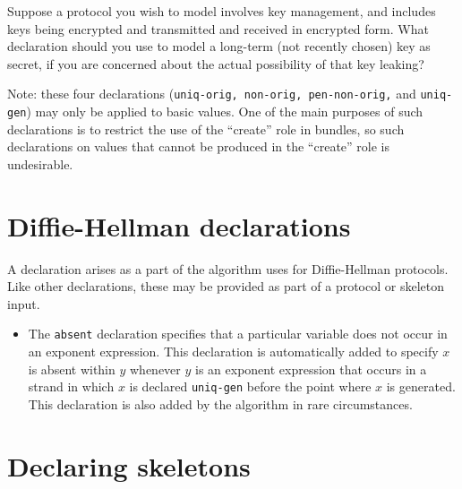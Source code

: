 \begin{exercise}
Suppose a protocol you wish to model involves key management, and
includes keys being encrypted and transmitted and received in
encrypted form.  What declaration should you use to model a long-term
(not recently chosen) key as secret, if you are concerned about the
actual possibility of that key leaking?
\end{exercise}

Note: these four declarations (\texttt{uniq-orig, non-orig,
  pen-non-orig,} and \texttt{uniq-gen}) may only be applied to basic
values.  One of the main purposes of such declarations is to restrict
the use of the ``create'' role in bundles, so such declarations on
values that cannot be produced in the ``create'' role is undesirable.

\section{Diffie-Hellman declarations}
A declaration arises as a part of the algorithm {\cpsa} uses for
Diffie-Hellman protocols.  Like other declarations, these may be
provided as part of a protocol or skeleton input.

\begin{itemize}

  \item {} The \texttt{absent} declaration specifies
    that a particular  variable does not occur in an %
    exponent expression.  This declaration is automatically added to
    specify $x$ is absent within $y$ whenever $y$ is an %
    exponent expression that occurs in a strand in which $x$ is
    declared \texttt{uniq-gen} before the point where $x$ is
    generated.  This declaration is also added by the algorithm in
    rare circumstances.
\end{itemize}

\section{Declaring skeletons}
\label{sec:defskeleton}


